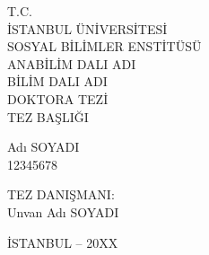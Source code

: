 \begin{titlepage}
\begin{center}

    \bfseries
    \fontsize{14pt}{16pt}\selectfont

    T.C. \\
    İSTANBUL ÜNİVERSİTESİ \\
    SOSYAL BİLİMLER ENSTİTÜSÜ \\
    \MakeUppercase{ANABİLİM DALI ADI} \\
    \MakeUppercase{BİLİM DALI ADI} \\
    \vspace{2.5cm}
    \MakeUppercase{DOKTORA TEZİ} \\
    

    \vspace{2.5cm}
    \MakeUppercase{TEZ BAŞLIĞI} \\

    \vspace{2.5cm}

    Adı \textsc{SOYADI} \\ %
    12345678 \\

    \vfill
    \fontsize{12pt}{14pt}\selectfont

    TEZ DANIŞMANI: \\
    Unvan Adı \textsc{SOYADI} \\ %

    \vspace{1cm}

    \centering
    \fontsize{14pt}{16pt}\selectfont
    İSTANBUL – 20XX

\end{center}
\end{titlepage}
